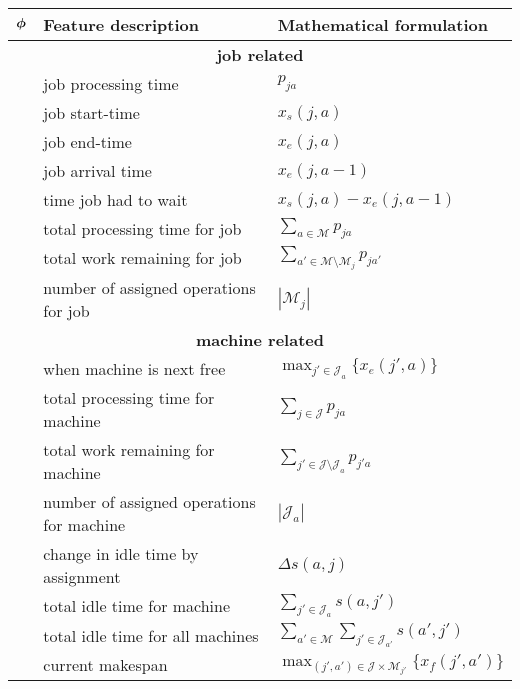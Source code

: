 \centering
\scriptsize
\begin{tabular}{cll} %
	\toprule
	$\bm{\phi}$ & Feature description & Mathematical formulation \\ 
	\midrule
	\multicolumn{3}{c}{\textbf{job related}}\\
	\phiproc & job processing time & $p_{ja}$ \\
	\phistartTime & job start-time & $x_s(j,a)$ \\
	\phiendTime & job end-time & $x_e(j,a)$ \\
	\phiarrivalTime & job arrival time & $x_e(j,a-1)$\\
	\phiwait & time job had to wait & $x_s(j,a)-x_e(j,a-1)$ \\
	\phijobTotProcTime & total processing time for job & 
 $\sum_{a\in \mathcal{M}}p_{ja}$ \\
	\phijobWrm & total work remaining for job & 
	$\sum_{a'\in\mathcal{M}\setminus \mathcal{M}_{j}}p_{ja'}$ \\
	\phijobOps & number of assigned operations for job & 
	$|\mathcal{M}_j|$ \\
	\midrule
	\multicolumn{3}{c}{\textbf{machine related}}\\
	\phimacFree & when machine is next free & 
 $\max_{j'\in \mathcal{J}_a} \{x_e(j',a)\}$ \\
	\phimacTotProcTime & total processing time for machine & 
 $\sum_{j\in \mathcal{J}}p_{ja}$ \\
	\phimacWrm & total work remaining for machine & 
	$\sum_{j'\in\mathcal{J}\setminus \mathcal{J}_{a}}p_{j'a}$ \\
	\phimacOps & number of assigned operations for machine & 
	$|\mathcal{J}_a|$ \\
	\phireducedSlack & change in idle time by assignment & 
 $\Delta s(a,j)$ \\
	\phimacSlack & total idle time for machine & 
 $\sum_{j'\in \mathcal{J}_a}s(a,j')$ \\
	\phiallSlack & total idle time for all machines & $\sum_{a'\in 
	\mathcal{M}}\sum_{j'\in \mathcal{J}_{a'}}s(a',j')$ \\
	\phimakespan & current makespan &
 $\max_{(j',a')\in \mathcal{J} \times \mathcal{M}_{j'}}\{x_f(j',a')\}$ \\
	\bottomrule
\end{tabular}